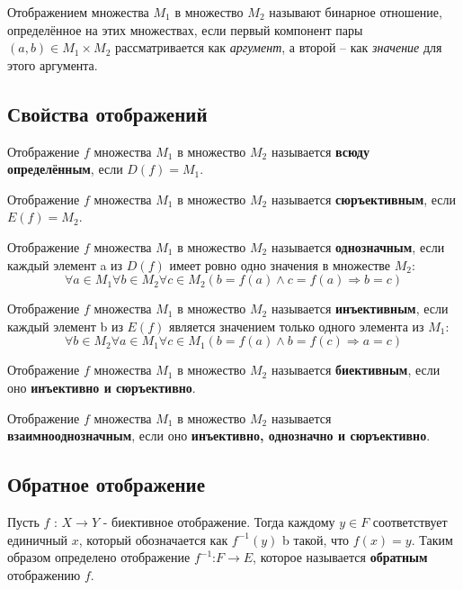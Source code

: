 \documentclass[a4paper]{article}
\begin{document}
    Отображением
    множества $M_1$ в множество $M_2$ называют бинарное отношение, определённое на
    этих множествах, если первый компонент пары $(a, b) \in M_1 \times M_2$ рассматривается как \textit{аргумент}, а второй – как \textit{значение} для этого аргумента.

    \subsection*{Свойства отображений}

    Отображение $f$ множества $M_1$ в множество $M_2$ называется
    \textbf{всюду определённым}, если $D(f) = M_1$.

    Отображение $f$ множества $M_1$ в множество $M_2$ называется
    \textbf{сюръективным}, если $E(f) = M_2$.

    Отображение $f$ множества $M_1$ в множество $M_2$ называется
    \textbf{однозначным}, если каждый элемент a из $D(f)$ имеет ровно одно значения в множестве $M_2$:
    \begin{equation}
        \forall a \in M_1 \forall b \in M_2 \forall c \in M_2 (b  = f(a) \land c = f(a) \Rightarrow b = c)
    \end{equation}


    Отображение $f$ множества $M_1$ в множество $M_2$ называется
    \textbf{инъективным}, если каждый элемент b из $E(f)$ является значением только одного элемента из $M_1$:
    \begin{equation}
        \forall b \in M_2 \forall a \in M_1 \forall c \in M_1 (b = f(a) \land b = f(c) \Rightarrow a = c)
    \end{equation}

    Отображение $f$ множества $M_1$ в множество $M_2$ называется
    \textbf{биективным}, если оно \textbf{инъективно и сюръективно}.

    Отображение $f$ множества $M_1$ в множество $M_2$ называется
    \textbf{взаимнооднозначным}, если оно \textbf{инъективно, однозначно и сюръективно}.

    \subsection*{Обратное отображение
    }
    Пусть $f$ : $X \rightarrow Y$ - биективное отображение. Тогда каждому $y \in F$ соответствует единичный $x$, который обозначается как $f^{-1} (y)$ b такой, что $f(x) = y$. Таким образом определено отображение $f^{-1}$:$F \rightarrow E$, которое называется \textbf{обратным} отображению $f$.
\end{document}
